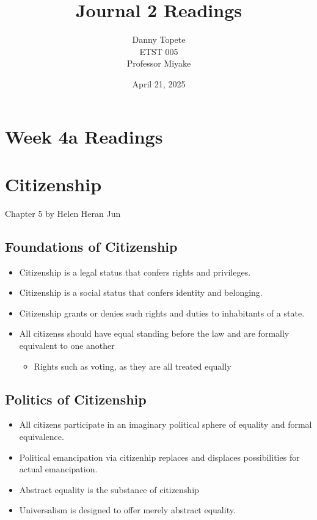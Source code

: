 \documentclass{article}
\title{Journal 2 Readings}
\author{Danny Topete\\ ETST 005\\ Professor Miyake}
\date{April 21, 2025}
\begin{document}
\maketitle

\section*{Week 4a Readings}

\section{Citizenship}
Chapter 5
by Helen Heran Jun
\subsection{Foundations of Citizenship}
\begin{itemize}
  \item Citizenship is a legal status that confers rights and privileges.
  \item Citizenship is a social status that confers identity and belonging.
  \item Citizenship grants or denies such rights and duties to
    inhabitants of a state.
  \item All citizenss should have equal standing before
    the law and are formally equivalent to one another
    \begin{itemize}
      \item Rights such as voting, as they are all treated equally
    \end{itemize}
\end{itemize}

\subsection{Politics of Citizenship}
\begin{itemize}
  \item All citizens participate in an imaginary
    political sphere of equality and formal equivalence.
  \item Political emancipation via citizenhip replaces and displaces
    possibilities for actual emancipation.
  \item Abstract equality is the substance of citizenship
  \item Universalism is designed to offer merely abstract equality.
\end{itemize}
\end{document}
